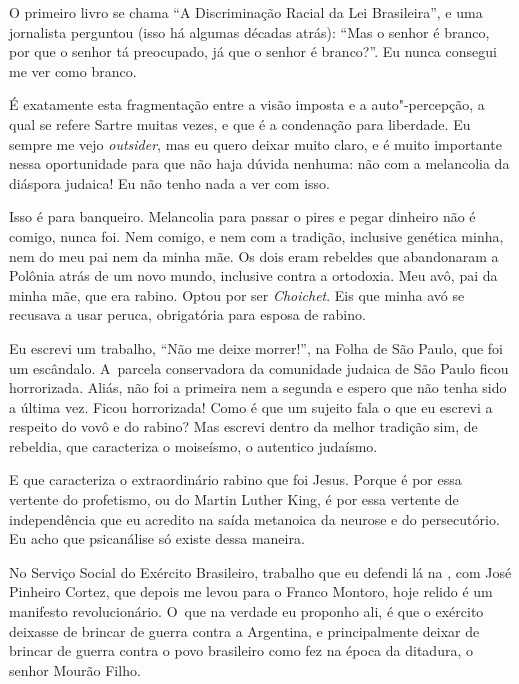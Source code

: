 O primeiro livro se chama ``A Discriminação Racial da Lei Brasileira'',
e uma jornalista perguntou (isso há algumas décadas atrás): ``Mas o
senhor é branco, por que o senhor tá preocupado, já que o senhor é
branco?''. Eu nunca consegui me ver como branco.

 

É exatamente esta fragmentação entre a visão imposta e a auto"-percepção,
a qual se refere Sartre muitas vezes, e que é a condenação para
liberdade. Eu sempre me vejo \emph{outsider}, mas eu quero deixar muito
claro, e é muito importante nessa oportunidade para que não haja dúvida
nenhuma: não com a melancolia da diáspora judaica! Eu não tenho nada a
ver com isso.

 

Isso é para banqueiro. Melancolia para passar o pires e pegar dinheiro
não é comigo, nunca foi. Nem comigo, e nem com a tradição, inclusive
genética minha, nem do meu pai nem da minha mãe. Os dois eram rebeldes
que abandonaram a Polônia atrás de um novo mundo, inclusive contra a
ortodoxia. Meu avô, pai da minha mãe, que era rabino. Optou por ser
\emph{Choichet}. Eis que minha avó se recusava a usar peruca,
obrigatória para esposa de rabino.

 

Eu escrevi um trabalho, ``Não me deixe morrer!'', na Folha de São Paulo,
que foi um escândalo. A~parcela conservadora da comunidade judaica de
São Paulo ficou horrorizada. Aliás, não foi a primeira nem a segunda e
espero que não tenha sido a última vez. Ficou horrorizada! Como é que um
sujeito fala o que eu escrevi a respeito do vovô e do rabino? Mas
escrevi dentro da melhor tradição sim, de rebeldia, que caracteriza o
moiseísmo, o autentico judaísmo.

 

E que caracteriza o extraordinário rabino que foi Jesus. Porque é por
essa vertente do profetismo, ou do Martin Luther King, é por essa
vertente de independência que eu acredito na saída metanoica da neurose
e do persecutório. Eu acho que psicanálise só existe dessa maneira.

 

No Serviço Social do Exército Brasileiro, trabalho que eu defendi lá na
, com José Pinheiro Cortez, que depois me levou para o Franco
Montoro, hoje relido é um manifesto revolucionário. O~que na verdade eu
proponho ali, é que o exército deixasse de brincar de guerra contra a
Argentina, e principalmente deixar de brincar de guerra contra o povo
brasileiro como fez na época da ditadura, o senhor Mourão Filho.

